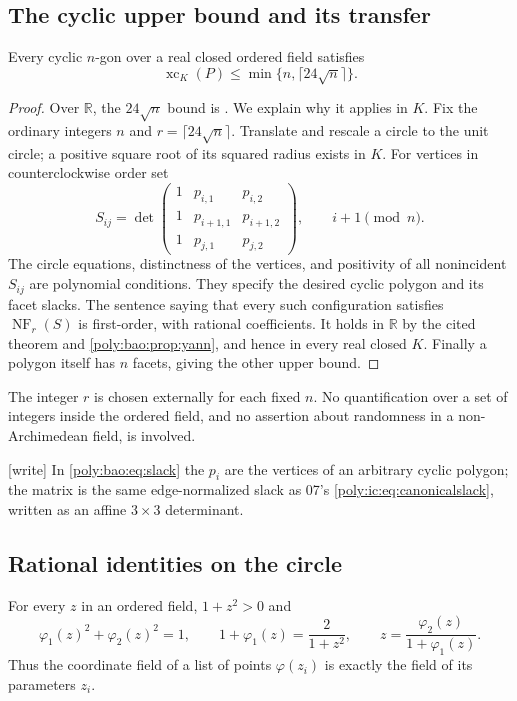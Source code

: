 \documentclass[11pt,a4paper]{article}
\numberwithin{equation}{section}
\theoremstyle{plain}
\newcommand{\wtag}{\textup{[write]}}%
\newcommand{\R}{\mathbb R}
\newcommand{\xc}{\operatorname{xc}}
\newcommand{\NF}{\operatorname{NF}}
\newcommand{\ph}{\varphi}
\begin{document}
\subsection{The cyclic upper bound and its transfer}
\begin{proposition}\label{poly:bao:prop:cyclicupper}
Every cyclic $n$-gon over a real closed ordered field satisfies
\[
 \xc_K(P)\leq\min\{n,\lceil24\sqrt n\rceil\}.
\]
\end{proposition}
\begin{proof}
Over $\R$, the $24\sqrt n$ bound is \cite[Theorem 1.3]{bao:KSZ}. We explain
why it applies in $K$. Fix the ordinary integers $n$ and
$r=\lceil24\sqrt n\rceil$. Translate and rescale a circle to the unit
circle; a positive square root of its squared radius exists in $K$.
For vertices in counterclockwise order set
\begin{equation}\label{poly:bao:eq:slack}
 S_{ij}=\det\begin{pmatrix}
 1&p_{i,1}&p_{i,2}\\
 1&p_{i+1,1}&p_{i+1,2}\\
 1&p_{j,1}&p_{j,2}
 \end{pmatrix},\qquad i+1\pmod n.
\end{equation}
The circle equations, distinctness of the vertices, and positivity of all
nonincident $S_{ij}$ are polynomial conditions. They specify the desired
cyclic polygon and its facet slacks. The sentence saying that every such
configuration satisfies $\NF_r(S)$ is first-order, with rational
coefficients. It holds in $\R$ by the cited theorem and
\cref{poly:bao:prop:yann}, and hence in every real closed $K$. Finally a polygon
itself has $n$ facets, giving the other upper bound.
\end{proof}
The integer $r$ is chosen externally for each fixed $n$. No quantification
over a set of integers inside the ordered field, and no assertion about
randomness in a non-Archimedean field, is involved.

\wtag{} In \eqref{poly:bao:eq:slack} the $p_i$ are the vertices of an
arbitrary cyclic polygon; the matrix is the same edge-normalized slack as
07's \eqref{poly:ic:eq:canonicalslack}, written as an affine
$3\times3$ determinant.

\subsection{Rational identities on the circle}
For every $z$ in an ordered field, $1+z^2>0$ and
\begin{equation}\label{poly:bao:eq:circleinverse}
 \ph_1(z)^2+\ph_2(z)^2=1,\qquad
 1+\ph_1(z)=\frac{2}{1+z^2},\qquad
 z=\frac{\ph_2(z)}{1+\ph_1(z)}.
\end{equation}
Thus the coordinate field of a list of points $\ph(z_i)$ is exactly the
field of its parameters $z_i$.
\end{document}
